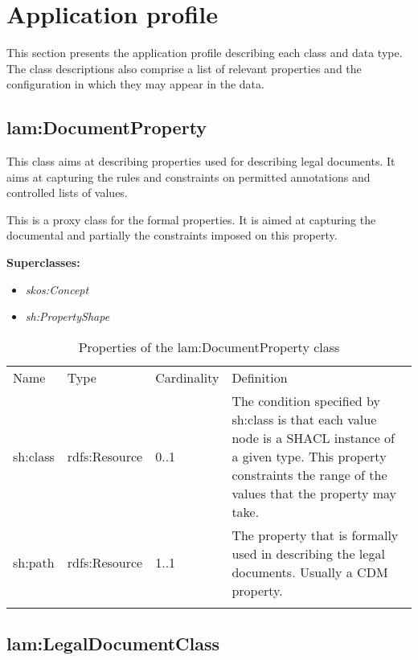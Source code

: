 \section{Application profile}\label{ariaid-title11}

This section presents the application profile describing each class and data type. 
The class descriptions also comprise a list of relevant properties and the configuration in which they may appear in the data.

\subsection{lam:DocumentProperty}

This class aims at describing properties used for describing legal
documents. It aims at capturing the rules and constraints on permitted
annotations and controlled lists of values.

This is a proxy class for the formal properties. It is aimed at
capturing the documental and partially the constraints imposed on this
property.

\textbf{Superclasses:}

\begin{itemize}
\itemsep1pt\parskip0pt
\item
  \emph{skos:Concept}
\item
  \emph{sh:PropertyShape}
\end{itemize}

{
	\footnotesize
	\selectfont%
	\begin{longtable}[c]{@{}p{3cm}p{2cm}p{2cm}p{7.8cm}@{}}
		\toprule\addlinespace
		Name & Type & Cardinality & Definition
		\\\addlinespace
		\midrule\endhead
		sh:class & rdfs:Resource & 0..1 & The condition specified by sh:class is
		that each value node is a SHACL instance of a given type. This property
		constraints the range of the values that the property may take.
		\\\addlinespace
		sh:path & rdfs:Resource & 1..1 & The property that is formally used in
		describing the legal documents. Usually a CDM property.
		\\\addlinespace
		\bottomrule
		\addlinespace
		\caption{Properties of the lam:DocumentProperty class}
	\end{longtable}
}

\subsection{lam:LegalDocumentClass}

